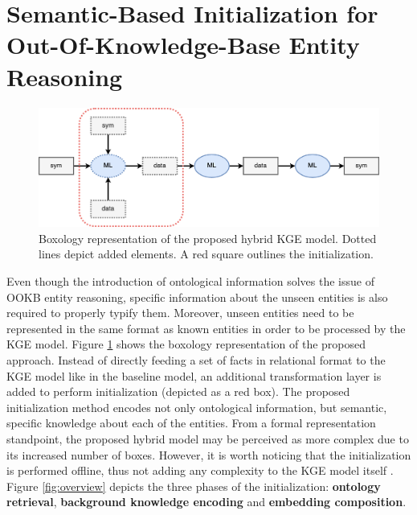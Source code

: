 \section{Semantic-Based Initialization for Out-Of-Knowledge-Base Entity Reasoning}
\begin{figure}
    \centering
    \includegraphics[width=\linewidth]{5_kbsintegrationdl/figures/boxology_krintodl.png}
    \caption{Boxology representation of the proposed hybrid KGE model. Dotted lines depict added elements. A red square outlines the initialization.}
    \label{fig:box_krintodl}
\end{figure} 

Even though the introduction of ontological information solves the issue of OOKB entity reasoning, specific information about the unseen entities is also required to properly typify them. Moreover, unseen entities need to be represented in the same format as known entities in order to be processed by the KGE model. Figure \ref{fig:box_krintodl} shows the boxology representation of the proposed approach. Instead of directly feeding a set of facts in relational format to the KGE model like in the baseline model, an additional transformation layer is added to perform initialization (depicted as a red box). The proposed initialization method encodes not only ontological information, but semantic, specific knowledge about each of the entities. From a formal representation standpoint, the proposed hybrid model may be perceived as more complex due to its increased number of boxes. However, it is worth noticing that the initialization is performed offline, thus not adding any complexity to the KGE model itself . Figure \ref{fig:overview} depicts the three phases of the initialization: \textbf{ontology retrieval}, \textbf{background knowledge encoding} and \textbf{embedding composition}.

 

